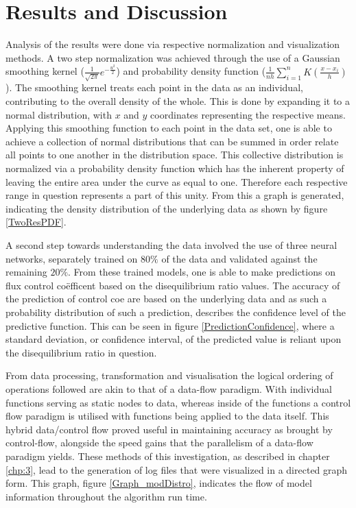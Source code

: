 \chapter{Results and Discussion} \label{chp:4}

Analysis of the results were done via respective normalization and visualization methods. A two step normalization was achieved through the use of a Gaussian smoothing kernel ($\frac{1}{\sqrt{2\pi}}e^{-\frac{u^2}{2}}$) and probability density function ($\frac{1}{nh}\sum^n_{i=1}K(\frac{x-x_i}{h})$). The smoothing kernel treats each point in the data as an individual, contributing to the overall density of the whole. This is done by expanding it to a normal distribution, with $x$ and $y$ coordinates representing the respective means. Applying this smoothing function to each point in the data set, one is able to achieve a collection of normal distributions that can be summed in order relate all points to one another in the distribution space. This collective distribution is normalized via a probability density function which has the inherent property of leaving the entire area under the curve as equal to one. Therefore each respective range in question represents a part of this unity. From this a graph is generated, indicating the density distribution of the underlying data as shown by figure \ref{TwoResPDF}.

A second step towards understanding the data involved the use of three neural networks, separately trained on $80\%$ of the data and validated against the remaining $20\%$. From these trained models, one is able to make predictions on flux control co\"efficent based on the disequilibrium ratio values. The accuracy of the prediction of control coe are based on the underlying data and as such a probability distribution of such a prediction, describes the confidence level of the predictive function. This can be seen in figure \ref{PredictionConfidence}, where a standard deviation, or confidence interval, of the predicted value is reliant upon the disequilibrium ratio in question. 

From data processing, transformation and visualisation the logical ordering of operations followed are akin to that of a data-flow paradigm. With individual functions serving as static nodes to data, whereas inside of the functions a control flow paradigm is utilised with functions being applied to the data itself. This hybrid data/control flow proved useful in maintaining accuracy as brought by control-flow, alongside the speed gains that the parallelism of a data-flow paradigm yields. These methods of this investigation, as described in chapter \ref{chp:3}, lead to the generation of log files that were visualized in a directed graph form. This graph, figure \ref{Graph_modDistro}, indicates the flow of model information throughout the algorithm run time. 

